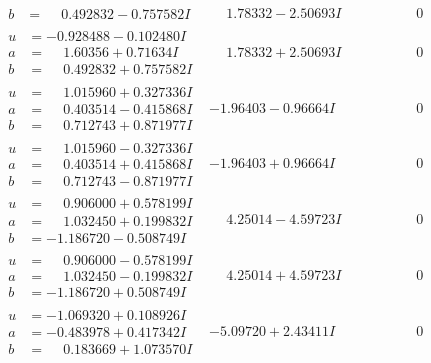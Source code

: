 \documentclass[1p]{elsarticle_modified}
\theoremstyle{definition}
\begin{document}
$$\begin{array}{c|c|c}
\begin{aligned}
b &= \phantom{-}0.492832 - 0.757582 I\end{aligned}
 & \phantom{-}1.78332 - 2.50693 I & \phantom{-0.000000 } 0 \\ \hline\begin{aligned}
u &= -0.928488 - 0.102480 I \\
a &= \phantom{-}1.60356 + 0.71634 I \\
b &= \phantom{-}0.492832 + 0.757582 I\end{aligned}
 & \phantom{-}1.78332 + 2.50693 I & \phantom{-0.000000 } 0 \\ \hline\begin{aligned}
u &= \phantom{-}1.015960 + 0.327336 I \\
a &= \phantom{-}0.403514 - 0.415868 I \\
b &= \phantom{-}0.712743 + 0.871977 I\end{aligned}
 & -1.96403 - 0.96664 I & \phantom{-0.000000 } 0 \\ \hline\begin{aligned}
u &= \phantom{-}1.015960 - 0.327336 I \\
a &= \phantom{-}0.403514 + 0.415868 I \\
b &= \phantom{-}0.712743 - 0.871977 I\end{aligned}
 & -1.96403 + 0.96664 I & \phantom{-0.000000 } 0 \\ \hline\begin{aligned}
u &= \phantom{-}0.906000 + 0.578199 I \\
a &= \phantom{-}1.032450 + 0.199832 I \\
b &= -1.186720 - 0.508749 I\end{aligned}
 & \phantom{-}4.25014 - 4.59723 I & \phantom{-0.000000 } 0 \\ \hline\begin{aligned}
u &= \phantom{-}0.906000 - 0.578199 I \\
a &= \phantom{-}1.032450 - 0.199832 I \\
b &= -1.186720 + 0.508749 I\end{aligned}
 & \phantom{-}4.25014 + 4.59723 I & \phantom{-0.000000 } 0 \\ \hline\begin{aligned}
u &= -1.069320 + 0.108926 I \\
a &= -0.483978 + 0.417342 I \\
b &= \phantom{-}0.183669 + 1.073570 I\end{aligned}
 & -5.09720 + 2.43411 I & \phantom{-0.000000 } 0 \\ \hline\begin{aligned}

\end{aligned}
\end{array}$$
\end{document}
